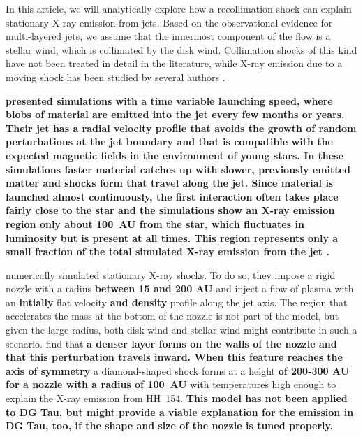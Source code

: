 In this article, we will analytically explore how a recollimation shock can explain stationary X-ray emission from jets. Based on the observational evidence for multi-layered jets, we assume that the innermost component of the flow is a stellar wind, which is collimated by the disk wind. Collimation shocks of this kind have not been treated in detail in the literature, while X-ray emission due to a moving shock has been studied by several authors \citep[see, e.g.\ the analytical work and numerical simulations by][]{2002ApJ...576L.149R,2007A&A...462..645B}.

\textbf{\citet{2010A&A...511A..42B} presented simulations with a time variable launching speed, where blobs of material are emitted into the jet every few months or years. Their jet has a radial velocity profile that avoids the growth of random perturbations at the jet boundary and that is compatible with the expected magnetic fields in the environment of young stars. In these simulations faster material catches up with slower, previously emitted matter and shocks form that travel along the jet. Since material is launched almost continuously, the first interaction often takes place fairly close to the star and the simulations show an X-ray emission region only about 100~AU from the star, which fluctuates in luminosity but is present at all times. This region represents only a small fraction of the total simulated X-ray emission from the jet \citep{2010A&A...517A..68B}. }

\citet{2011ApJ...737...54B} numerically simulated stationary X-ray shocks. To do so, they impose a rigid nozzle with a radius \textbf{between 15 and 200 AU} and inject a flow of plasma with an \textbf{intially} flat velocity \textbf{and density} profile along the jet axis. The region that accelerates the mass at the bottom of the nozzle is not part of the model, but given the large radius, both disk wind and stellar wind might contribute in such a scenario. \citet{2011ApJ...737...54B} find that \textbf{a denser layer forms on the walls of the nozzle and that this perturbation travels inward. When this feature reaches the axis of symmetry} a diamond-shaped shock forms at a height \textbf{of 200-300 AU for a nozzle with a radius of 100~AU} with temperatures high enough to explain the X-ray emission from HH~154. \textbf{This model has not been applied to DG Tau, but might provide a viable explanation for the emission in DG Tau, too, if the shape and size of the nozzle is tuned properly.} 

